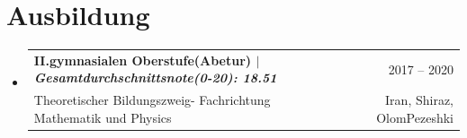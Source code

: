 \documentclass[A4,11pt]{article}
\makeatletter
\newcommand{\CVSubheading}[4]{
  \vspace{-2pt}\item
    \begin{tabular*}{0.97\textwidth}[t]{l@{\extracolsep{\fill}}r}
      \textbf{#1} & #2 \\
      \small#3 & \small #4 \\
    \end{tabular*}\vspace{-7pt}
}
\newcommand{\CVSubHeadingListStart}{\begin{itemize}[leftmargin=0.5cm, label={}]}
\newcommand{\CVSubHeadingListEnd}{\end{itemize}}
\makeatother
\begin{document}

\section{Ausbildung}
  \CVSubHeadingListStart
    \CVSubheading
      {{II.gymnasialen Oberstufe(Abetur) $|$ \emph{\small{Gesamtdurchschnittsnote(0-20): 18.51}}}}{2017 -- 2020}
      {Theoretischer Bildungszweig- Fachrichtung Mathematik und Physics}{Iran, Shiraz, OlomPezeshki}
  \CVSubHeadingListEnd
\end{document}

